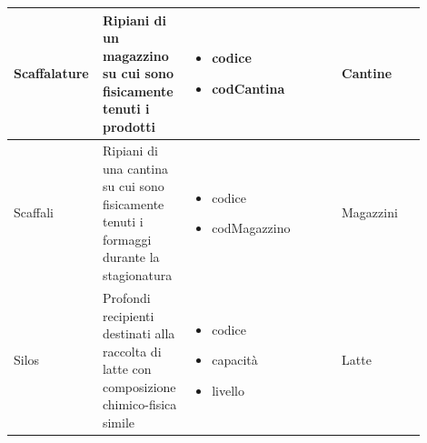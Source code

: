 \documentclass[12pt,a4paper]{article}
\begin{document}
\begin{center}
\begin{longtable}{|p{0.14\linewidth}|p{0.20\linewidth}|p{0.36\linewidth}|p{0.20\linewidth}|}
\hline
Scaffalature				 	&  Ripiani di un magazzino su cui sono fisicamente tenuti i prodotti 
					& \begin{itemize}
						\setlength{\itemindent}{-1em}
						\vspace{-25pt}
						\setlength\itemsep{-0.25em}
						\item codice
						\item codCantina
					\end{itemize}
					&  Cantine  \\ 

\hline
Scaffali				 	&  Ripiani di una cantina su cui sono fisicamente tenuti i formaggi durante la stagionatura 
					& \begin{itemize}
						\setlength{\itemindent}{-1em}
						\vspace{-25pt}
						\setlength\itemsep{-0.25em}
						\item codice
						\item codMagazzino
					\end{itemize}
					&  Magazzini  \\ 

\hline
Silos				 	&  Profondi recipienti destinati alla raccolta di latte con composizione chimico-fisica simile 
					& \begin{itemize}
						\setlength{\itemindent}{-1em}
						\vspace{-25pt}
						\setlength\itemsep{-0.25em}
						\item codice
						\item capacità
						\item livello
					\end{itemize}
					&  Latte  \\ 

\hline

\end{longtable}
\end{center}
\pagebreak
\end{document}
